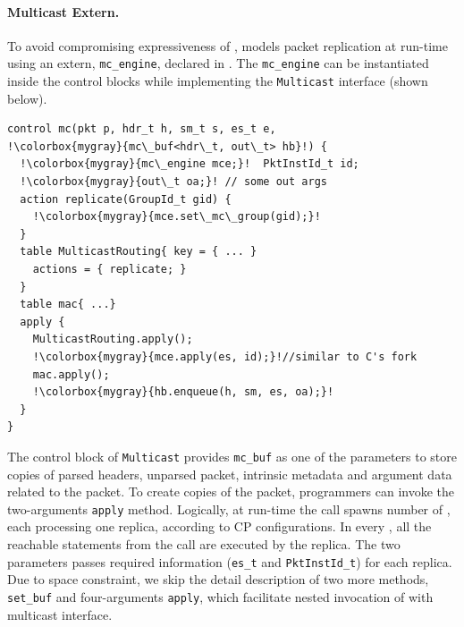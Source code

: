 \documentclass[letterpaper,twocolumn,10pt]{article}
\begin{document}
\paragraph{Multicast Extern.}
To avoid compromising expressiveness of \uprograms, \uswitch models 
packet replication at run-time using an extern, \texttt{mc\_engine}, 
declared in \uarch. The \texttt{mc\_engine} can be instantiated 
inside 
the control blocks while implementing the \texttt{Multicast} 
interface 
(shown below).
\begin{lstlisting}[frame=none, escapechar=!]
control mc(pkt p, hdr_t h, sm_t s, es_t e, 
!\colorbox{mygray}{mc\_buf<hdr\_t, out\_t> hb}!) {
  !\colorbox{mygray}{mc\_engine mce;}!  PktInstId_t id; 
  !\colorbox{mygray}{out\_t oa;}! // some out args
  action replicate(GroupId_t gid) {
    !\colorbox{mygray}{mce.set\_mc\_group(gid);}!
  }
  table MulticastRouting{ key = { ... } 
    actions = { replicate; }
  }
  table mac{ ...}
  apply {
    MulticastRouting.apply();
    !\colorbox{mygray}{mce.apply(es, id);}!//similar to C's fork
    mac.apply();
    !\colorbox{mygray}{hb.enqueue(h, sm, es, oa);}!
  }
}
\end{lstlisting}
The control block of \texttt{Multicast} provides 
\texttt{mc\_buf} as one of the parameters to store copies of parsed 
headers, unparsed packet, intrinsic metadata and argument data 
related 
to the packet. 
To create copies of the packet, programmers can invoke the 
two-arguments \texttt{apply} method. Logically, at run-time the call 
spawns number of \upipelines, each processing one replica, according 
to CP configurations. In every \upipeline, all the reachable 
statements from the call are executed by the replica. The two 
parameters passes required information (\texttt{es\_t} and 
\texttt{PktInstId\_t}) for each replica.
Due to space constraint, we skip the detail description of two more 
methods, \texttt{set\_buf} and four-arguments \texttt{apply}, which 
facilitate nested invocation of \upackages with multicast interface. 

\end{document}
